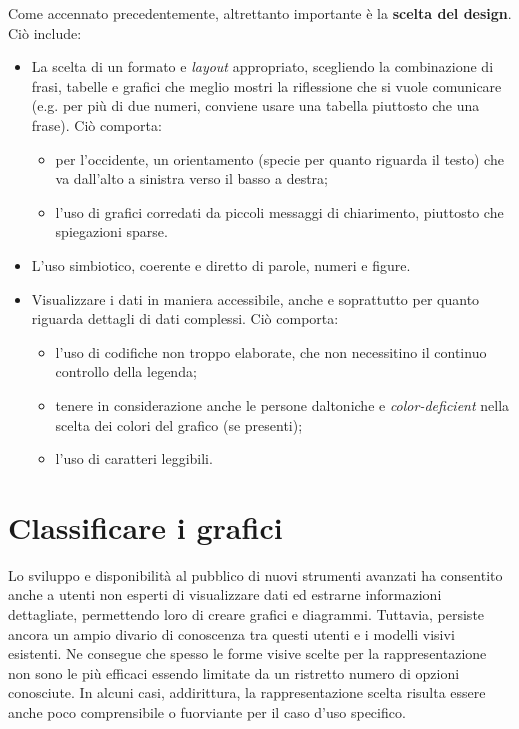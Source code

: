 \noindent Come accennato precedentemente, altrettanto importante è la \textbf{scelta del design}. Ciò include:
\begin{itemize}
    \item La scelta di un formato e \emph{layout} appropriato, scegliendo la combinazione di frasi, tabelle
    e grafici che meglio mostri la riflessione che si vuole comunicare (e.g. per più di due numeri, conviene usare una tabella piuttosto che una frase). Ciò comporta:
    \begin{itemize}
        \item per l'occidente, un orientamento (specie per quanto riguarda il testo) che va dall'alto a sinistra verso il basso a destra;
        \item l'uso di grafici corredati da piccoli messaggi di chiarimento, piuttosto che spiegazioni sparse.
    \end{itemize}
    \item L'uso simbiotico, coerente e diretto di parole, numeri e figure.
    \item Visualizzare i dati in maniera accessibile, anche e soprattutto per quanto riguarda dettagli di dati complessi. Ciò comporta:
    \begin{itemize}
        \item l'uso di codifiche non troppo elaborate, che non necessitino il continuo controllo della legenda;
        \item tenere in considerazione anche le persone daltoniche e \emph{color-deficient} nella scelta dei colori del grafico (se presenti);
        \item l'uso di caratteri leggibili.
    \end{itemize}
\end{itemize}



\section{Classificare i grafici}\label{sec:classificare_grafici}
Lo sviluppo e disponibilità al pubblico di nuovi strumenti avanzati ha consentito anche a utenti non esperti di visualizzare dati ed estrarne informazioni dettagliate, 
permettendo loro di creare grafici e diagrammi.
Tuttavia, persiste ancora un ampio divario di conoscenza tra questi utenti e i modelli visivi esistenti.
Ne consegue che spesso le forme visive scelte per la rappresentazione non sono le più efficaci essendo limitate da un ristretto numero di opzioni conosciute.
In alcuni casi, addirittura, la rappresentazione scelta risulta essere anche poco comprensibile o fuorviante per il caso d'uso specifico.

